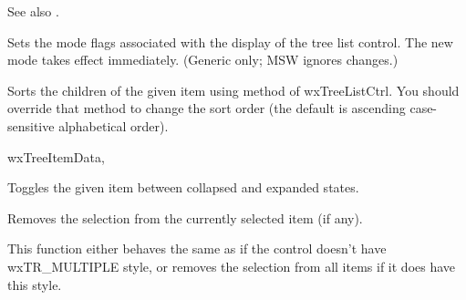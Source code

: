 See also .


Sets the mode flags associated with the display of the tree list control.
The new mode takes effect immediately.
(Generic only; MSW ignores changes.)

\label{wxtreelistctrlsortchildren}


Sorts the children of the given item using
 method of wxTreeListCtrl. You
should override that method to change the sort order (the default is ascending
case-sensitive alphabetical order).


wxTreeItemData, 

\label{wxtreelistctrltoggle}


Toggles the given item between collapsed and expanded states.

\label{wxtreelistctrlunselect}


Removes the selection from the currently selected item (if any).

\label{wxtreelistctrlunselectall}


This function either behaves the same as 
if the control doesn't have wxTR\_MULTIPLE style, or removes the selection from
all items if it does have this style.


\label{wxtreelistctrladdcolumn}




